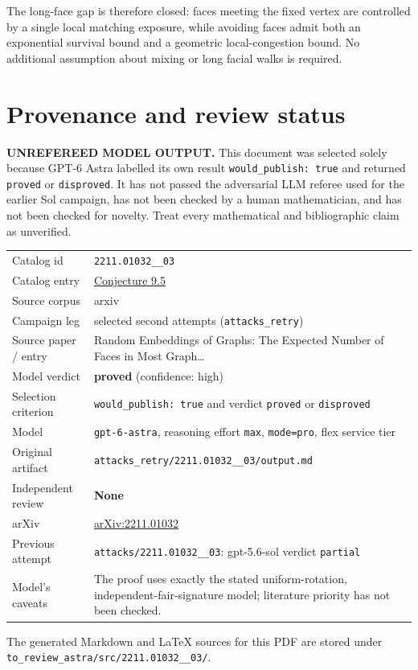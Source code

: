\documentclass[
  11pt,
  a4paper,
]{article}
\newcounter{none} %
\begin{document}
The long-face gap is therefore closed: faces meeting the fixed vertex
are controlled by a single local matching exposure, while avoiding faces
admit both an exponential survival bound and a geometric
local-congestion bound. No additional assumption about mixing or long
facial walks is required.

\appendix

\section{Provenance and review
status}\label{provenance-and-review-status}

\begin{warning}

\textbf{UNREFEREED MODEL OUTPUT.} This document was selected solely
because GPT-6 Astra labelled its own result
\texttt{would\_publish:\ true} and returned \texttt{proved} or
\texttt{disproved}. It has not passed the adversarial LLM referee used
for the earlier Sol campaign, has not been checked by a human
mathematician, and has not been checked for novelty. Treat every
mathematical and bibliographic claim as unverified.

\end{warning}

{\def\LTcaptype{none} %
\begin{longtable}[]{@{}
  >{\raggedright\arraybackslash}p{}
  >{\raggedright\arraybackslash}p{}@{}}
\toprule\noalign{}
\endhead
\bottomrule\noalign{}
\endlastfoot
Catalog id & \texttt{2211.01032\_\_03} \\
Catalog entry &
\href{https://graph-theory-ai.github.io/graph-conjectures/arxiv/2211.01032__03/}{Conjecture
9.5} \\
Source corpus & arxiv \\
Campaign leg & selected second attempts (\texttt{attacks\_retry}) \\
Source paper / entry & Random Embeddings of Graphs: The Expected Number
of Faces in Most Graph\ldots{} \\
Model verdict & \textbf{proved} (confidence: high) \\
Selection criterion & \texttt{would\_publish:\ true} and verdict
\texttt{proved} or \texttt{disproved} \\
Model & \texttt{gpt-6-astra}, reasoning effort \texttt{max},
\texttt{mode=pro}, flex service tier \\
Original artifact &
\texttt{attacks\_retry/2211.01032\_\_03/output.md} \\
Independent review & \textbf{None} \\
arXiv & \href{https://arxiv.org/abs/2211.01032}{arXiv:2211.01032} \\
Previous attempt & \texttt{attacks/2211.01032\_\_03}: gpt-5.6-sol
verdict \texttt{partial} \\
Model's caveats & The proof uses exactly the stated uniform-rotation,
independent-fair-signature model; literature priority has not been
checked. \\
\end{longtable}
}

The generated Markdown and LaTeX sources for this PDF are stored under
\texttt{to\_review\_astra/src/2211.01032\_\_03/}.
\end{document}
